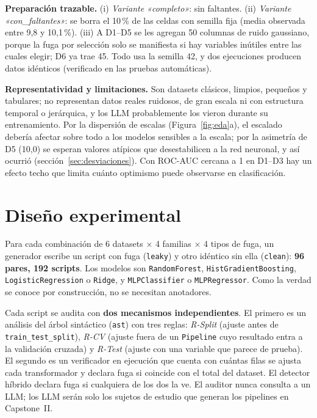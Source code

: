 \textbf{Preparación trazable.} (i) \emph{Variante «completo»}: sin faltantes. (ii) \emph{Variante «con\_faltantes»}: se borra el 10\,\% de las celdas con semilla fija (media observada entre 9,8 y 10,1\,\%). (iii) A D1--D5 se les agregan 50 columnas de ruido gaussiano, porque la fuga por selección solo se manifiesta si hay variables inútiles entre las cuales elegir; D6 ya trae 45. Todo usa la semilla 42, y dos ejecuciones producen datos idénticos (verificado en las pruebas automáticas).

\textbf{Representatividad y limitaciones.} Son datasets clásicos, limpios, pequeños y tabulares; no representan datos reales ruidosos, de gran escala ni con estructura temporal o jerárquica, y los LLM probablemente los vieron durante su entrenamiento. Por la dispersión de escalas (Figura~\ref{fig:eda}a), el escalado debería afectar sobre todo a los modelos sensibles a la escala; por la asimetría de D5 (10,0) se esperan valores atípicos que desestabilicen a la red neuronal, y así ocurrió (sección~\ref{sec:desviaciones}). Con ROC-AUC cercana a 1 en D1--D3 hay un efecto techo que limita cuánto optimismo puede observarse en clasificación.

\section{Diseño experimental}
\label{sec:diseno}

Para cada combinación de 6 datasets $\times$ 4 familias $\times$ 4 tipos de fuga, un generador escribe un script con fuga (\texttt{leaky}) y otro idéntico sin ella (\texttt{clean}): \textbf{96 pares, 192 scripts}. Los modelos son \texttt{RandomForest}, \texttt{HistGradientBoosting}, \texttt{LogisticRegression} o \texttt{Ridge}, y \texttt{MLPClassifier} o \texttt{MLPRegressor}. Como la verdad se conoce por construcción, no se necesitan anotadores.

Cada script se audita con \textbf{dos mecanismos independientes}. El primero es un análisis del árbol sintáctico (\texttt{ast}) con tres reglas: \emph{R-Split} (ajuste antes de \texttt{train\_test\_split}), \emph{R-CV} (ajuste fuera de un \texttt{Pipeline} cuyo resultado entra a la validación cruzada) y \emph{R-Test} (ajuste con una variable que parece de prueba). El segundo es un verificador en ejecución que cuenta con cuántas filas se ajusta cada transformador y declara fuga si coincide con el total del dataset. El detector híbrido declara fuga si cualquiera de los dos la ve. El auditor nunca consulta a un LLM; los LLM serán solo los sujetos de estudio que generan los pipelines en Capstone~II.

